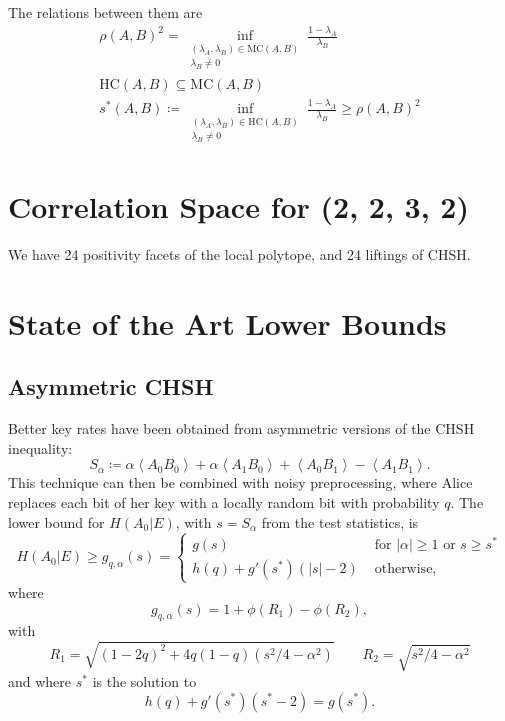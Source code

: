 \documentclass[10pt, a4paper]{article}
\newcommand{\abs}[1]{\left\lvert#1\right\rvert}
\newcommand{\?}{\mathrel{?}} %
\newcommand{\angleb}[1]{\left\langle #1 \right\rangle} %
\numberwithin{equation}{section} %
\theoremstyle{definition}
\theoremstyle{plain}
\theoremstyle{plain}
\newcommand{\HC}{\mathrm{HC}}
\newcommand{\MC}{\mathrm{MC}}
\begin{document}
    The relations between them are
    \begin{gather}
      {\rho(A,B)}^2 = \inf_{\substack{(\lambda_A, \lambda_B) \in \MC(A,B) \\ \lambda_B \neq 0}} \frac{1 - \lambda_A}{\lambda_B} \\
      \HC(A,B) \subseteq \MC(A,B) \\
      s^*(A,B) \coloneqq \inf_{\substack{(\lambda_A, \lambda_B) \in \HC(A,B) \\ \lambda_B \neq 0}} \frac{1 - \lambda_A}{\lambda_B} \geq {\rho(A,B)}^2
    \end{gather}

    \section{Correlation Space for (2, 2, 3, 2)}

    We have 24 positivity facets of the local polytope, and 24 liftings of CHSH\@.

    \section{State of the Art Lower Bounds}

    \subsection{Asymmetric CHSH}

    Better key rates have been obtained from asymmetric versions of the CHSH inequality:
    \begin{equation}
      S_{\alpha} \coloneqq \alpha\angleb{A_0 B_0} + \alpha\angleb{A_1 B_0} + \angleb{A_0 B_1} - \angleb{A_1 B_1}.
    \end{equation}
    This technique can then be combined with noisy preprocessing, where Alice replaces each bit of her key with a locally random bit with probability \(q\). The lower bound for \(H(A_0|E)\), with \(s = S_{\alpha}\) from the test statistics, is
    \[ H(A_0|E) \geq g_{q,\alpha}(s) = \begin{cases}
      g(s) & \text{ for } \abs{\alpha} \geq 1 \text{ or } s \geq s^* \\
      h(q) + g'(s^*)(\abs{s}-2) & \text{ otherwise},
    \end{cases}
    \]
    where
    \begin{equation}
      g_{q,\alpha}(s) = 1 + \phi\left(R_1\right) - \phi\left(R_2\right),
    \end{equation}
    with
    \begin{equation} 
      R_1 = \sqrt{{(1-2q)}^2 + 4q(1-q)(s^2/4-\alpha^2)} \qquad R_2 = \sqrt{s^2/4-\alpha^2}
    \end{equation}
    and where \(s^*\) is the solution to
    \begin{equation}\label{eqn:sstar}
      h(q) + g'(s^*) (s^*-2) = g(s^*).
    \end{equation}
\end{document}

